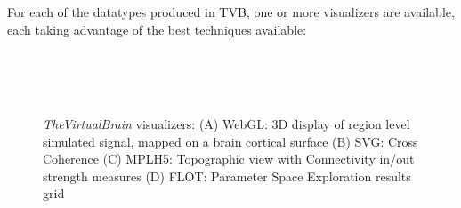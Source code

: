\documentclass{bioinfo}
\newcommand{\TVB}{\textit{TheVirtualBrain }}
\begin{document}
			For each of the datatypes produced in TVB, one or more
			visualizers are available, each taking advantage of the best
            techniques available:

			 \begin{figure}[!htbp]
					\\
					\\
					\\
					\caption{\TVB visualizers: 
					(A) WebGL: 3D display of region level simulated signal, mapped on a brain cortical surface
					(B) SVG: Cross Coherence
					(C) MPLH5:  Topographic view with Connectivity in/out strength measures
					(D) FLOT: Parameter Space Exploration results grid}
				\label{fig:visualizers}
			\end{figure}
	
\end{document}
